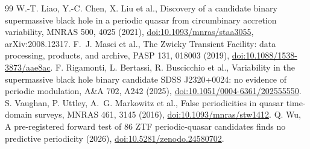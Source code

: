 \documentclass[11pt]{article}
\begin{document}
\begin{thebibliography}{99}
 W.-T. Liao, Y.-C. Chen, X. Liu et al., Discovery of a candidate binary supermassive black hole in a periodic quasar from circumbinary accretion variability, MNRAS 500, 4025 (2021), \href{https://doi.org/10.1093/mnras/staa3055}{doi:10.1093/mnras/staa3055}, arXiv:2008.12317.
 F.~J. Masci et al., The Zwicky Transient Facility: data processing, products, and archive, PASP 131, 018003 (2019), \href{https://doi.org/10.1088/1538-3873/aae8ac}{doi:10.1088/1538-3873/aae8ac}.
 F. Rigamonti, L. Bertassi, R. Buscicchio et al., Variability in the supermassive black hole binary candidate SDSS J2320+0024: no evidence of periodic modulation, A\&A 702, A242 (2025), \href{https://doi.org/10.1051/0004-6361/202555550}{doi:10.1051/0004-6361/202555550}.
 S. Vaughan, P. Uttley, A.~G. Markowitz et al., False periodicities in quasar time-domain surveys, MNRAS 461, 3145 (2016), \href{https://doi.org/10.1093/mnras/stw1412}{doi:10.1093/mnras/stw1412}.
 Q. Wu, A pre-registered forward test of 86 ZTF periodic-quasar candidates finds no predictive periodicity (2026), \href{https://doi.org/10.5281/zenodo.24580702}{doi:10.5281/zenodo.24580702}.
\end{thebibliography}
\end{document}
